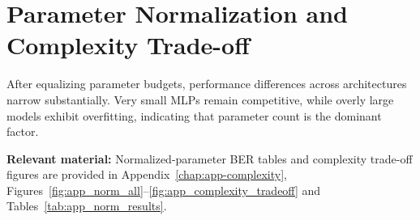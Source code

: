 \section{Parameter Normalization and Complexity Trade-off}
\label{sec:parameter-complexity}

After equalizing parameter budgets, performance differences across architectures narrow substantially.
Very small MLPs remain competitive, while overly large models exhibit overfitting, indicating that parameter count is the dominant factor.

\textbf{Relevant material:}
Normalized-parameter BER tables and complexity trade-off figures are provided in
Appendix~\ref{chap:app-complexity},
Figures~\ref{fig:app_norm_all}--\ref{fig:app_complexity_tradeoff}
and Tables~\ref{tab:app_norm_results}.